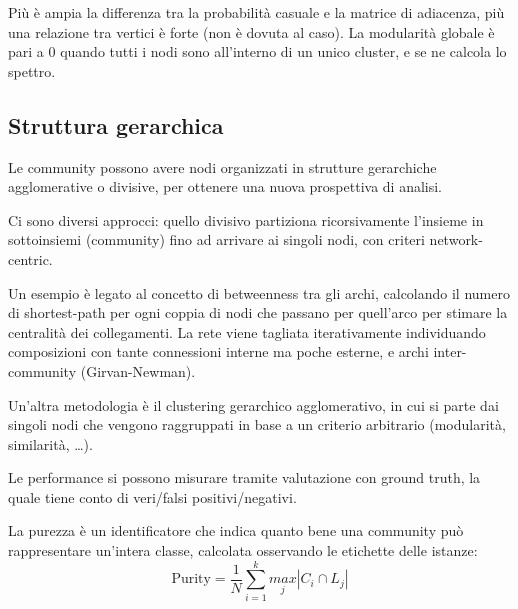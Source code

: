 Più è ampia la differenza tra la probabilità casuale e la matrice di adiacenza, più una relazione tra vertici è forte (non è dovuta al caso). La modularità globale è pari a 0 quando tutti i nodi sono all'interno di un unico cluster, e se ne calcola lo spettro. 

\subsection{Struttura gerarchica}
Le community possono avere nodi organizzati in strutture gerarchiche agglomerative o divisive, per ottenere una nuova prospettiva di analisi.

Ci sono diversi approcci: quello divisivo partiziona ricorsivamente l'insieme in sottoinsiemi (community) fino ad arrivare ai singoli nodi, con criteri network-centric. 

Un esempio è legato al concetto di betweenness tra gli archi, calcolando il numero di shortest-path per ogni coppia di nodi che passano per quell'arco per stimare la centralità dei collegamenti. La rete viene tagliata iterativamente individuando composizioni con tante connessioni interne ma poche esterne, e archi inter-community (Girvan-Newman).

Un'altra metodologia è il clustering gerarchico agglomerativo, in cui si parte dai singoli nodi che vengono raggruppati in base a un criterio arbitrario (modularità, similarità, \dots).

Le performance si possono misurare tramite valutazione con ground truth, la quale tiene conto di veri/falsi positivi/negativi. 

La purezza è un identificatore che indica quanto bene una community può rappresentare un'intera classe, calcolata osservando le etichette delle istanze:
$$\text{Purity} = \frac{1}{N} \sum_{i=1}^{k} \underset{j}{max} |C_i \cap L_j|$$








